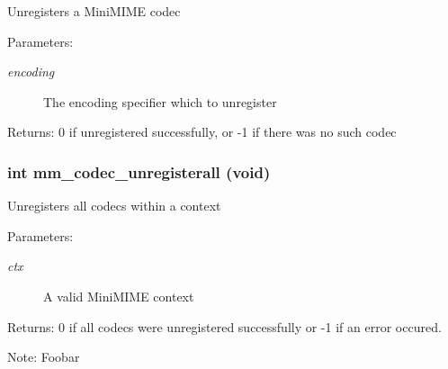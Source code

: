 Unregisters a Mini\-MIME codec

\begin{Desc}
\item[Parameters:]
\begin{description}
\item[{\em encoding}]The encoding specifier which to unregister \end{description}
\end{Desc}
\begin{Desc}
\item[Returns:]0 if unregistered successfully, or -1 if there was no such codec \end{Desc}
\subsubsection{\setlength{\rightskip}{0pt plus 5cm}int mm\_\-codec\_\-unregisterall (void)}\label{group__codecs_g7c9e6538f84c368be2b56a3c9ba702be}


Unregisters all codecs within a context

\begin{Desc}
\item[Parameters:]
\begin{description}
\item[{\em ctx}]A valid Mini\-MIME context \end{description}
\end{Desc}
\begin{Desc}
\item[Returns:]0 if all codecs were unregistered successfully or -1 if an error occured. \end{Desc}
\begin{Desc}
\item[Note:]Foobar \end{Desc}
